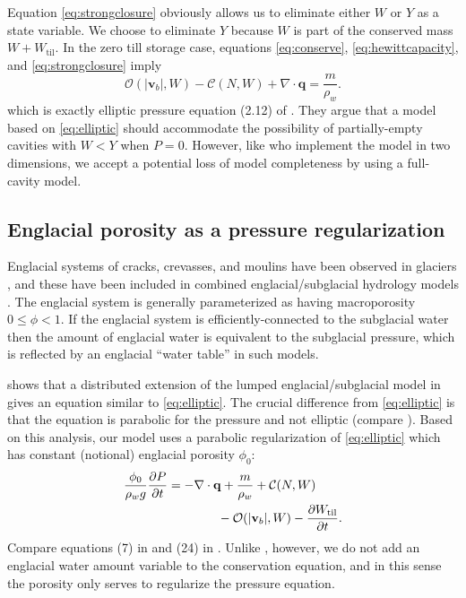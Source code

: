 \documentclass[gmd]{copernicus}   %
\newcommand{\text}{\textrm}
\newcommand\bv{\mathbf{v}}
\newcommand\bq{\mathbf{q}}
\newcommand{\ddt}[1]{\ensuremath{\frac{\partial #1}{\partial t}}}
\newcommand{\Div}{\nabla\cdot}
\newcommand{\Wtil}{W_{\text{til}}}
\begin{document}
Equation \eqref{eq:strongclosure} obviously allows us to eliminate either $W$ or $Y$ as a state variable.  We choose to eliminate $Y$ because $W$ is part of the conserved mass $W + \Wtil$.  In the zero till storage case, equations \eqref{eq:conserve}, \eqref{eq:hewittcapacity}, and \eqref{eq:strongclosure} imply
\begin{equation}
\mathcal{O}(|\bv_b|,W) - \mathcal{C}(N,W) + \Div\bq = \frac{m}{\rho_w}. \label{eq:elliptic}
\end{equation}
which is exactly elliptic pressure equation (2.12) of \cite{Schoofetal2012}.  They argue that a model based on \eqref{eq:elliptic} should accommodate the possibility of partially-empty cavities with $W<Y$ when $P=0$.  However, like \cite{Werderetal2013} who implement the model in two dimensions, we accept a potential loss of model completeness by using a full-cavity model.

\subsection{Englacial porosity as a pressure regularization}  Englacial systems of cracks, crevasses, and moulins have been observed in glaciers \citep[for example]{Fountainetal2005,Bartholomausetal2008,Harperetal2010}, and these have been included in combined englacial/subglacial hydrology models \citep{FlowersClarke2002_theory,Bartholomausetal2011,Hewitt2013,Werderetal2013}.  The englacial system is generally parameterized as having macroporosity $0\le \phi < 1$.  If the englacial system is efficiently-connected to the subglacial water then the amount of englacial water is equivalent to the subglacial pressure, which is reflected by an englacial ``water table'' in such models.

\cite{Bueler2014correspondence} shows that a distributed extension of the lumped englacial/subglacial model in \cite{Bartholomausetal2011} gives an equation similar to \eqref{eq:elliptic}.  The crucial difference from \eqref{eq:elliptic} is that the equation is parabolic for the pressure and not elliptic (compare \cite{Hewittetal2012}).  Based on this analysis, our model uses a parabolic regularization of \eqref{eq:elliptic} which has constant (notional) englacial porosity $\phi_0$:
\begin{align}
\frac{\phi_0}{\rho_w g} \ddt{P} &= - \Div \bq + \frac{m}{\rho_w} + \mathcal{C}(N,W)  \label{eq:regpressureequation} \\
  &\qquad\qquad - \mathcal{O}(|\bv_b|,W) - \ddt{\Wtil}. \notag
\end{align}
Compare equations (7) in \citep{Hewitt2013} and (24) in \citep{Werderetal2013}.  Unlike \cite{Werderetal2013}, however, we do not add an englacial water amount variable to the conservation equation, and in this sense the porosity only serves to regularize the pressure equation.
\end{document}
